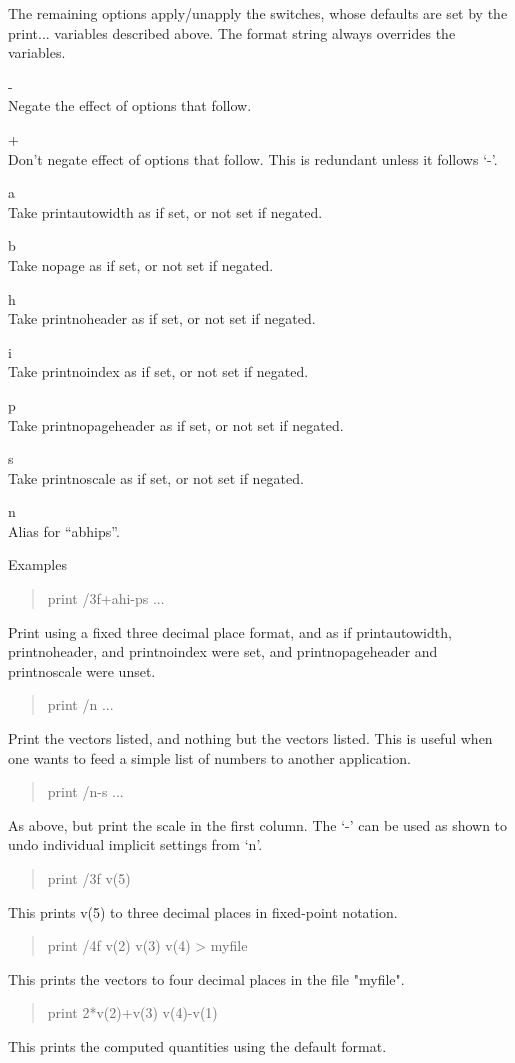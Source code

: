 The remaining options apply/unapply the switches, whose defaults are
set by the {\et print...} variables described above.  The format
string always overrides the variables.

\begin{description}
\item{\vt -}\\
Negate the effect of options that follow.
\item{\vt +}\\
Don't negate effect of options that follow.  This is redundant
unless it follows `{\vt -}'.
\item{\vt a}\\
Take {\et printautowidth} as if set, or not set if negated.
\item{\vt b}\\
Take {\et nopage} as if set, or not set if negated.
\item{\vt h}\\
Take {\et printnoheader} as if set, or not set if negated.
\item{\vt i}\\
Take {\et printnoindex} as if set, or not set if negated.
\item{\vt p}\\
Take {\et printnopageheader} as if set, or not set if negated.
\item{\vt s}\\
Take {\et printnoscale} as if set, or not set if negated.
\item{\vt n}\\
Alias for ``{\vt abhips}''.
\end{description}

Examples
\begin{quote}\vt
print /3f+ahi-ps ...
\end{quote}
Print using a fixed three decimal place format, and as if {\et
printautowidth}, {\et printnoheader}, and {\et printnoindex} were set,
and {\et printnopageheader} and {\et printnoscale} were unset.
\begin{quote}\vt
print /n ...
\end{quote}
Print the vectors listed, and nothing but the vectors listed.  This is
useful when one wants to feed a simple list of numbers to another
application.
\begin{quote}\vt
print /n-s ...
\end{quote}
As above, but print the scale in the first column.  The `{\vt -}' can
be used as shown to undo individual implicit settings from `{\vt n}'.
\begin{quote}\vt
print /3f v(5)
\end{quote}
This prints v(5) to three decimal places in fixed-point notation.
\begin{quote}\vt
print /4f v(2) v(3) v(4) > myfile
\end{quote}
This prints the vectors to four decimal places in the file "myfile".
\begin{quote}\vt
print 2*v(2)+v(3) v(4)-v(1)
\end{quote}
This prints the computed quantities using the default format.

